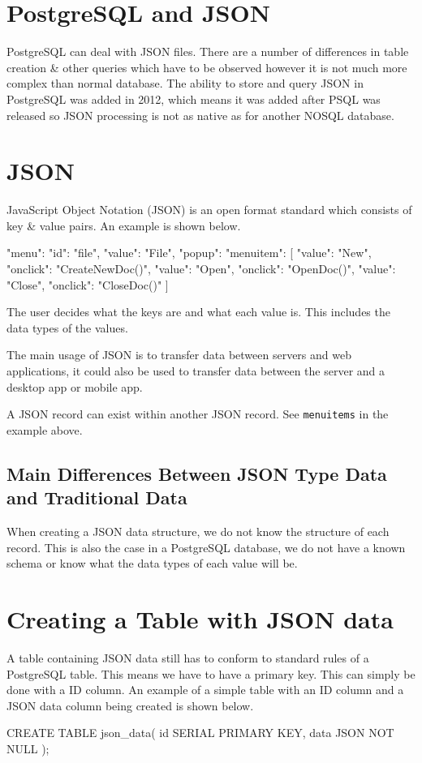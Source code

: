 
\section{PostgreSQL and JSON}
PostgreSQL can deal with JSON files. There are a number of differences in table creation \& other queries which have to be observed however it is not much more complex than normal database. The ability to store and query JSON in PostgreSQL was added in 2012, which means it was added after PSQL was released so JSON processing is not as native as for another NOSQL database.

\section{JSON}
JavaScript Object Notation (JSON) is an open format standard which consists of key \& value pairs. An example is shown below.
\begin{pseudo}
{"menu": {
  "id": "file",
  "value": "File",
  "popup": {
    "menuitem": [
      {"value": "New", "onclick": "CreateNewDoc()"},
      {"value": "Open", "onclick": "OpenDoc()"},
      {"value": "Close", "onclick": "CloseDoc()"}
    ]
  }
}}
\end{pseudo}

The user decides what the keys are and what each value is. This includes the data types of the values.

The main usage of JSON is to transfer data between servers and web applications, it could also be used to transfer data between the server and a desktop app or mobile app. 

A JSON record can exist within another JSON record. See \verb|menuitems| in the example above. 

\subsection{Main Differences Between JSON Type Data and Traditional Data}
When creating a JSON data structure, we do not know the structure of each record. This is also the case in a PostgreSQL database, we do not have a known schema or know what the data types of each value will be. 

\section{Creating a Table with JSON data}
A table containing JSON data still has to conform to standard rules of a PostgreSQL table. This means we have to have a primary key. This can simply be done with a ID column. An example of a simple table with an ID column and a JSON data column being created is shown below.
\begin{sql}
CREATE TABLE json_data(
    id SERIAL PRIMARY KEY,
    data JSON NOT NULL
);
\end{sql}

